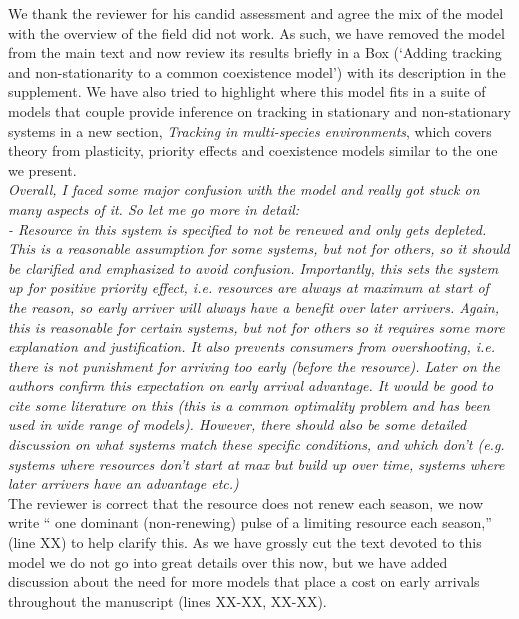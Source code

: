 \documentclass[11pt]{article}
\begin{document}
We thank the reviewer for his candid assessment and agree the mix of the model with the overview of the field did not work. As such, we have removed the model from the main text and now review its results briefly in a Box (`Adding tracking and non-stationarity to a common coexistence model') with its description in the supplement. We have also tried to highlight where this model fits in a suite of models that couple provide inference on tracking in stationary and non-stationary systems in a new section, \emph{Tracking in multi-species environments}, which covers theory from plasticity, priority effects and coexistence models similar to the one we present.  \\


\emph{Overall, I faced some major confusion with the model and really got stuck on many aspects of
it. So let me go more in detail:\\
-       Resource in this system is specified to not be renewed and only gets depleted. This
is a reasonable assumption for some systems, but not for others, so it should be clarified
and emphasized to avoid confusion. Importantly, this sets the system up for positive priority
effect, i.e. resources are always at maximum at start of the reason, so early arriver will
always have a benefit over later arrivers. Again, this is reasonable for certain systems, but
not for others so it requires some more explanation and justification. It also prevents
consumers from overshooting, i.e. there is not punishment for arriving too early (before the
resource). Later on the authors confirm this expectation on early arrival advantage. It would
be good to cite some literature on this (this is a common optimality problem and has been
used in wide range of models). However, there should also be some detailed discussion on what
systems match these specific conditions, and which don’t (e.g. systems where resources don’t
start at max but build up over time, systems where later arrivers have an advantage etc.)}\\

The reviewer is correct that the resource does not renew each season, we now write `` one dominant (non-renewing) pulse of a limiting resource each season,'' (line XX) to help clarify this. As we have grossly cut the text devoted to this model we do not go into great details over this now, but we have added discussion about the need for more models that place a cost on early arrivals throughout the manuscript (lines XX-XX, XX-XX). \\
\end{document}
